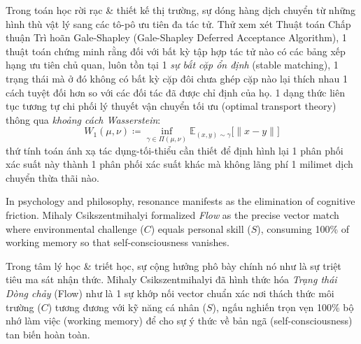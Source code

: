 \documentclass[11pt]{article}
\begin{document}
Trong toán học rời rạc \& thiết kế thị trường, sự dóng hàng dịch chuyển từ những hình thù vật lý sang các tô-pô ưu tiên đa tác tử. Thử xem xét Thuật toán Chấp thuận Trì hoãn Gale-Shapley (Gale-Shapley Deferred Acceptance Algorithm), 1 thuật toán chứng minh rằng đối với bất kỳ tập hợp tác tử nào có các bảng xếp hạng ưu tiên chủ quan, luôn tồn tại 1 \emph{sự bắt cặp ổn định} (stable matching), 1 trạng thái mà ở đó không có bất kỳ cặp đôi chưa ghép cặp nào lại thích nhau 1 cách tuyệt đối hơn so với các đối tác đã được chỉ định của họ. 1 dạng thức liên tục tương tự chi phối lý thuyết vận chuyển tối ưu (optimal transport theory) thông qua \emph{khoảng cách Wasserstein}:
\[ W_1(\mu, \nu)\coloneqq\inf_{\gamma\in\Pi(\mu,\nu)} \mathbb{E}_{(x,y)\sim\gamma} \big[\|x - y\|\big] \]
thứ tính toán ánh xạ tác dụng-tối-thiểu cần thiết để định hình lại 1 phân phối xác suất này thành 1 phân phối xác suất khác mà không lãng phí 1 milimet dịch chuyển thừa thãi nào.

In psychology and philosophy, resonance manifests as the elimination of cognitive friction. Mihaly Csikszentmihalyi \cite{Csikszentmihalyi_flow} formalized \emph{Flow} as the precise vector match where environmental challenge ($C$) equals personal skill ($S$), consuming 100\% of working memory so that self-consciousness vanishes.

Trong tâm lý học \& triết học, sự cộng hưởng phô bày chính nó như là sự triệt tiêu ma sát nhận thức. Mihaly Csikszentmihalyi \cite{Csikszentmihalyi_flow} đã hình thức hóa \emph{Trạng thái Dòng chảy} (Flow) như là 1 sự khớp nối vector chuẩn xác nơi thách thức môi trường ($C$) tương đương với kỹ năng cá nhân ($S$), ngấu nghiến trọn vẹn 100\% bộ nhớ làm việc (working memory) để cho sự ý thức về bản ngã (self-consciousness) tan biến hoàn toàn.

\begin{center}
\end{center}
\end{document}
